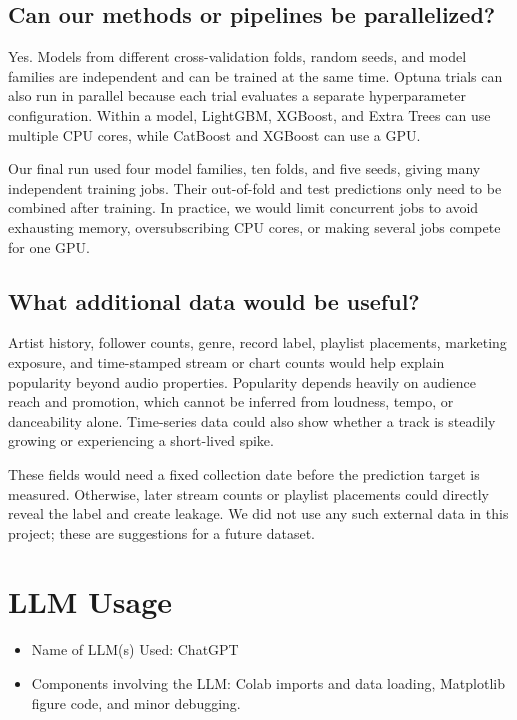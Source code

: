 \documentclass{article}
\begin{document}
\subsection{Can our methods or pipelines be parallelized?}
Yes. Models from different cross-validation folds, random seeds, and model
families are independent and can be trained at the same time. Optuna trials
can also run in parallel because each trial evaluates a separate
hyperparameter configuration. Within a model, LightGBM, XGBoost, and Extra
Trees can use multiple CPU cores, while CatBoost and XGBoost can use a GPU.

Our final run used four model families, ten folds, and five seeds, giving many
independent training jobs. Their out-of-fold and test predictions only need to
be combined after training. In practice, we would limit concurrent jobs to
avoid exhausting memory, oversubscribing CPU cores, or making several jobs
compete for one GPU.

\subsection{What additional data would be useful?}
Artist history, follower counts, genre, record label, playlist placements,
marketing exposure, and time-stamped stream or chart counts would help explain
popularity beyond audio properties. Popularity depends heavily on audience
reach and promotion, which cannot be inferred from loudness, tempo, or
danceability alone. Time-series data could also show whether a track is
steadily growing or experiencing a short-lived spike.

These fields would need a fixed collection date before the prediction target
is measured. Otherwise, later stream counts or playlist placements could
directly reveal the label and create leakage. We did not use any such external
data in this project; these are suggestions for a future dataset.

\newpage

\section{LLM Usage}
\begin{itemize}
  \item Name of LLM(s) Used: ChatGPT
  \item Components involving the LLM: Colab imports and data loading,
  Matplotlib figure code, and minor debugging.
\end{itemize}
\end{document}
